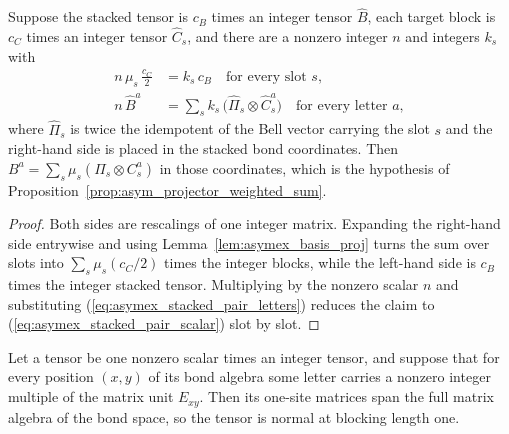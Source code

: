 \begin{theorem}
    \label{thm:asymex_stacked_pair}
    \leanok
    Suppose the stacked tensor is $c_B$ times an integer tensor
    $\widehat B$, each target block is $c_C$ times an integer tensor
    $\widehat C_s$, and there are a nonzero integer $n$ and integers $k_s$
    with
    \begin{align}
        n\,\mu_s\,\frac{c_C}{2} & =k_s\,c_B
        \quad\text{for every slot }s,
        \label{eq:asymex_stacked_pair_scalar}                            \\
        n\,\widehat B^a         & =\sum_sk_s\,\bigl(\widehat\Pi_s\otimes
        \widehat C_s^a\bigr)\quad\text{for every letter }a,
        \label{eq:asymex_stacked_pair_letters}
    \end{align}
    where $\widehat\Pi_s$ is twice the idempotent of the Bell vector
    carrying the slot $s$ and the right-hand side is placed in the stacked
    bond coordinates. Then
    $B^a=\sum_s\mu_s(\Pi_s\otimes C_s^a)$ in those coordinates, which is
    the hypothesis of Proposition~\ref{prop:asym_projector_weighted_sum}.
\end{theorem}

\begin{proof}
    \leanok
    Both sides are rescalings of one integer matrix. Expanding the
    right-hand side entrywise and using
    Lemma~\ref{lem:asymex_basis_proj} turns the sum over slots into
    $\sum_s\mu_s(c_C/2)$ times the integer blocks, while the left-hand side
    is $c_B$ times the integer stacked tensor. Multiplying by the nonzero
    scalar $n$ and substituting
    (\ref{eq:asymex_stacked_pair_letters}) reduces the claim to
    (\ref{eq:asymex_stacked_pair_scalar}) slot by slot.
\end{proof}

\begin{theorem}
    \label{thm:asymex_normal_units}
    \leanok
    Let a tensor be one nonzero scalar times an integer tensor, and suppose
    that for every position $(x,y)$ of its bond algebra some letter carries
    a nonzero integer multiple of the matrix unit $E_{xy}$. Then its
    one-site matrices span the full matrix algebra of the bond space, so
    the tensor is normal at blocking length one.
\end{theorem}

